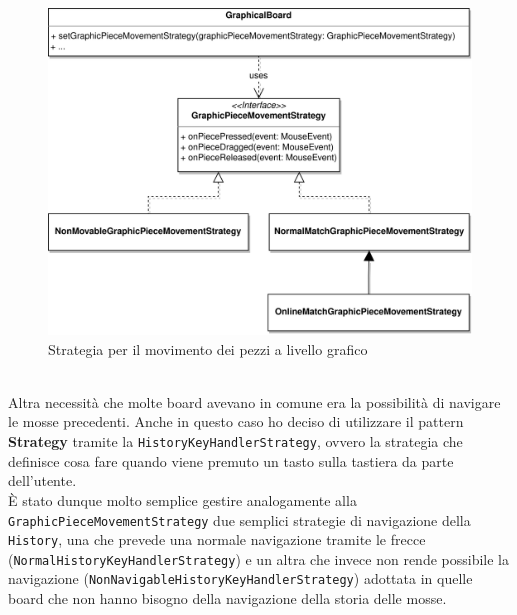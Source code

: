\documentclass[a4paper,12pt]{report}
\begin{document}
%
\begin{figure}[H]
    \begin{center}
        \centering
        \includegraphics[width=\textwidth]{img/Alessandro/graphical_piece_movement_strategy.png}
    \end{center}
    \caption{Strategia per il movimento dei pezzi a livello grafico}
    \label{img:graphical_piece_movement_strategy}
\end{figure}
%
\
\\
Altra necessità che molte board avevano in comune era la possibilità di navigare le mosse precedenti.
Anche in questo caso ho deciso di utilizzare il pattern \textbf{Strategy} tramite la \texttt{HistoryKeyHandlerStrategy}, ovvero la strategia che definisce cosa fare quando viene premuto un tasto sulla tastiera da parte dell'utente.
\\
È stato dunque molto semplice gestire analogamente alla
\texttt{GraphicPieceMovementStrategy} due semplici strategie di navigazione della \texttt{History}, una che prevede una normale navigazione tramite le frecce (\texttt{NormalHistoryKeyHandlerStrategy}) e un altra che invece non rende possibile la navigazione (\texttt{NonNavigableHistoryKeyHandlerStrategy}) adottata in quelle board che non hanno bisogno della navigazione della storia delle mosse. 
%
\end{document}
